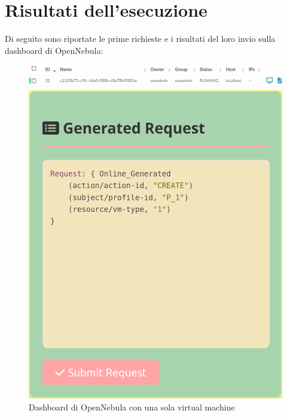 \section{Risultati dell'esecuzione}
Di seguito sono riportate le prime richieste e i risultati del loro invio sulla dashboard di OpenNebula:
\begin{figure}[H]
    \centering
    \begin{minipage}{1\textwidth}
        \centering
        \includegraphics[width=\textwidth]{tesi_screenshot/OpenNebula_firstVM.png}
        \caption{Dashboard di OpenNebula con una sola virtual machine}
    \end{minipage}
    \begin{minipage}{0.49\textwidth}
        \centering
        \includegraphics[width=\textwidth]{tesi_screenshot/P1Create_1.png}
    \end{minipage}
    \begin{minipage}{0.49\textwidth}

\end{minipage}
\end{figure}
